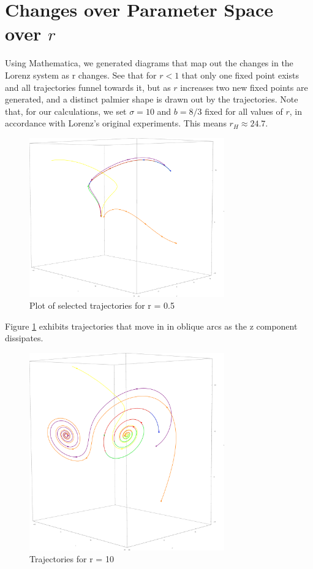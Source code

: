 \documentclass{report}
\begin{document}
\section{Changes over Parameter Space over \(r\)}

Using Mathematica, we generated diagrams that map out the changes in the
Lorenz system as r changes. See that for \(r < 1\) that only one fixed point
exists and all trajectories funnel towards it, but as \(r\) increases two new
fixed points are generated, and a distinct palmier shape is drawn out by
the trajectories. Note that, for our calculations, we set \(\sigma = 10\) and
\(b = 8/3 \) fixed for all values of \(r\), in accordance with Lorenz's
original experiments. This means \(r_H \approx 24.7\).

\begin{figure}[h]
  \centering
  \includegraphics[width=0.75\textwidth]{r0.5.eps}
  \caption{Plot of selected trajectories for r = 0.5}
  \label{fig:r_small}
\end{figure}
Figure \ref{fig:r_small} exhibits trajectories that move in in oblique arcs
as the z component dissipates.
\begin{figure}[h]
  \centering
  \includegraphics[width=0.75\textwidth]{r10.eps}
  \caption{Trajectories for r = 10}
  \label{fig:r_10}
\end{figure}
\end{document}
